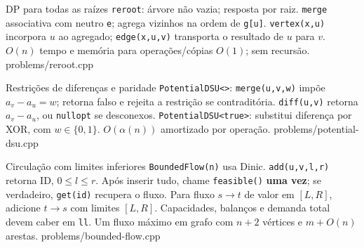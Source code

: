\templateentry
{DP para todas as raízes}
{}
{\texttt{reroot}: árvore não vazia; resposta por raiz. \texttt{merge} associativa com neutro \texttt{e}; agrega vizinhos na ordem de \texttt{g[u]}. \texttt{vertex(x,u)} incorpora $u$ ao agregado; \texttt{edge(x,u,v)} transporta o resultado de $u$ para $v$. $O(n)$ tempo e memória para operações/cópias $O(1)$; sem recursão.}
{problems/reroot.cpp}

\templateentry
{Restrições de diferenças e paridade}
{}
{\texttt{PotentialDSU<>}: \texttt{merge(u,v,w)} impõe $a_v-a_u=w$; retorna falso e rejeita a restrição se contraditória. \texttt{diff(u,v)} retorna $a_v-a_u$, ou \texttt{nullopt} se desconexos. \texttt{PotentialDSU<true>}: substitui diferença por XOR, com $w\in\{0,1\}$. $O(\alpha(n))$ amortizado por operação.}
{problems/potential-dsu.cpp}

\templateentry
{Circulação com limites inferiores}
{}
{\texttt{BoundedFlow(n)} usa Dinic. \texttt{add(u,v,l,r)} retorna ID, $0\le l\le r$. Após inserir tudo, chame \texttt{feasible()} \textbf{uma vez}; se verdadeiro, \texttt{get(id)} recupera o fluxo. Para fluxo $s\to t$ de valor em $[L,R]$, adicione $t\to s$ com limites $[L,R]$. Capacidades, balanços e demanda total devem caber em \texttt{ll}. Um fluxo máximo em grafo com $n+2$ vértices e $m+O(n)$ arestas.}
{problems/bounded-flow.cpp}
